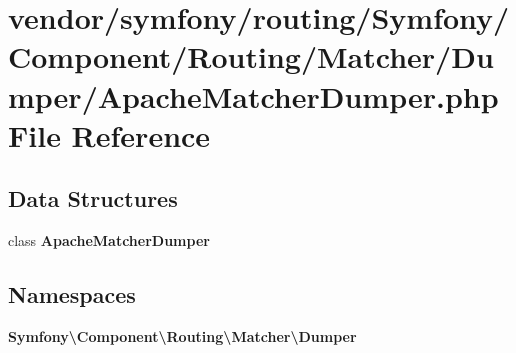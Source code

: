 \section{vendor/symfony/routing/\+Symfony/\+Component/\+Routing/\+Matcher/\+Dumper/\+Apache\+Matcher\+Dumper.php File Reference}
\label{_apache_matcher_dumper_8php}
\subsection*{Data Structures}
\begin{DoxyCompactItemize}
\item 
class {\bf Apache\+Matcher\+Dumper}
\end{DoxyCompactItemize}
\subsection*{Namespaces}
\begin{DoxyCompactItemize}
\item 
 {\bf Symfony\textbackslash{}\+Component\textbackslash{}\+Routing\textbackslash{}\+Matcher\textbackslash{}\+Dumper}
\end{DoxyCompactItemize}
